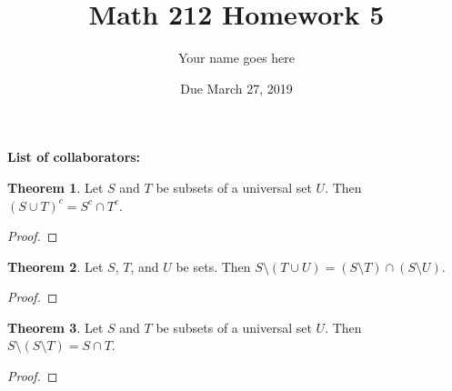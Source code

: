 \documentclass[11pt]{article}		%
\title{Math 212 Homework 5}
\author{Your name goes here}
\date{Due March 27, 2019}
\theoremstyle{definition}
\newtheorem{theorem}{Theorem}
\begin{document}
\maketitle

\noindent\textbf{List of collaborators:}


\begin{theorem}
	Let $S$ and $T$ be subsets of a universal set $U$.
	Then $(S\cup T)^c = S^c \cap T^c$.
\end{theorem}

\begin{proof}

\end{proof}


\begin{theorem}
	Let $S$, $T$, and $U$ be sets.
	Then $S\setminus (T\cup U) = (S\setminus T) \cap (S\setminus U)$.
\end{theorem}

\begin{proof} %

\end{proof}


\begin{theorem}
	Let $S$ and $T$ be subsets of a universal set $U$.
	Then $S\setminus (S\setminus T) = S\cap T$.
\end{theorem}

\begin{proof}

\end{proof}
\end{document}
